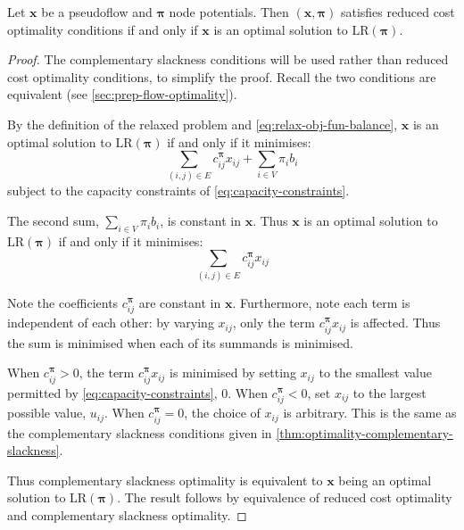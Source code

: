 \begin{lemma} \label{lemma:relax-rc-lr-equivalence}
Let $\mathbf{x}$ be a pseudoflow and $\boldsymbol{\pi}$ node potentials. Then $\left(\mathbf{x},\boldsymbol{\pi}\right)$ satisfies reduced cost optimality conditions if and only if $\mathbf{x}$ is an optimal solution to $\mathrm{LR}(\boldsymbol{\pi})$.
\end{lemma}
\begin{proof}
The complementary slackness conditions will be used rather than reduced cost optimality conditions, to simplify the proof. Recall the two conditions are equivalent (see \cref{sec:prep-flow-optimality}).

By the definition of the relaxed problem and  \cref{eq:relax-obj-fun-balance}, $\mathbf{x}$ is an optimal solution to $\mathrm{LR}(\boldsymbol{\pi})$ if and only if it minimises:
\[\sum_{\left(i,j\right)\in E}c_{ij}^{\boldsymbol{\pi}}x_{ij}+\sum_{i\in V}\pi_{i}b_{i}\]
subject to the capacity constraints of \cref{eq:capacity-constraints}.

The second sum, $\sum_{i \in V} \pi_i b_i$, is constant in $\mathbf{x}$. Thus $\mathbf{x}$ is an optimal solution to $\mathrm{LR}(\boldsymbol{\pi})$ if and only if it minimises:
\[\sum_{\left(i,j\right)\in E}c_{ij}^{\boldsymbol{\pi}}x_{ij}\]

Note the coefficients $c_{ij}^{\boldsymbol{\pi}}$ are constant in $\mathbf{x}$. Furthermore, note each term is independent of each other: by varying $x_{ij}$, only the term $c_{ij}^{\boldsymbol{\pi}}x_{ij}$ is affected\footnotemark. Thus the sum is minimised when each of its summands is minimised.

When $c_{ij}^{\boldsymbol{\pi}}>0$, the term $c_{ij}^{\boldsymbol{\pi}}x_{ij}$ is minimised by setting $x_{ij}$ to the smallest value permitted by \cref{eq:capacity-constraints}, $0$. When $c_{ij}^{\boldsymbol{\pi}}<0$, set $x_{ij}$ to the largest possible value, $u_{ij}$. When $c_{ij}^{\boldsymbol{\pi}}=0$, the choice of $x_{ij}$ is arbitrary. This is the same as the complementary slackness conditions given in \cref{thm:optimality-complementary-slackness}. 

Thus complementary slackness optimality is equivalent to $\mathbf{x}$ being an optimal solution to $\mathrm{LR}(\boldsymbol{\pi})$. The result follows by equivalence of reduced cost optimality and complementary slackness optimality.
\end{proof}

